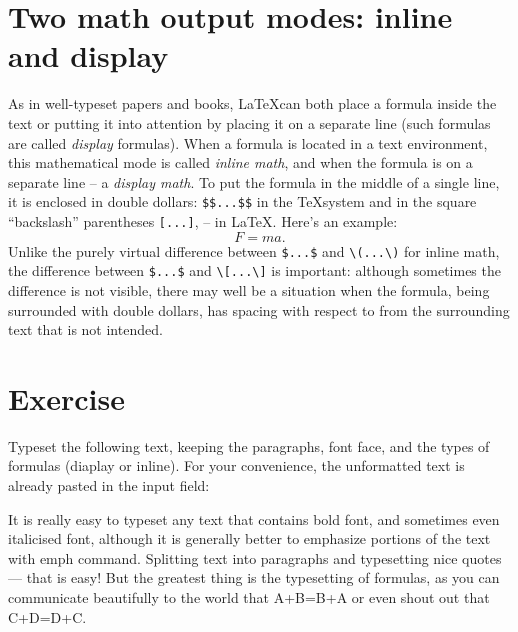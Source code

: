 {\section{Two math output modes: inline and display}
\par As in well-typeset papers and books, \LaTeX can both place a formula inside the text or putting it into attention by placing it on a separate line (such formulas are called \emph{display} formulas). When a formula is located in a text environment, this mathematical mode is called \emph{inline math}, and when the formula is on a separate line -- a \emph{display math}. To put the formula in the middle of a single line, it is enclosed in double dollars: \verb"$$...$$" in the \TeX system and in the square ``backslash'' parentheses \verb"[...]", -- in \LaTeX. Here’s an example: \[F=ma.\]
Unlike the purely virtual difference between \verb"$...$" and \verb"\(...\)" for inline math, the difference between \verb"$...$" and \verb"\[...\]" is important: although sometimes the difference is not visible, there may well be a situation when the formula, being surrounded with double dollars, has spacing with respect to from the surrounding text that is not intended.

\section{Exercise}
\begin{staticpart}
Typeset the following text, keeping the paragraphs, font face, and the types of formulas (diaplay or inline). For your convenience, the unformatted text is already pasted in the input field:
\end{staticpart}
It is really easy to typeset any text that contains bold font, and sometimes even italicised font, although it is generally better to emphasize portions of the text with emph command. Splitting text into paragraphs and typesetting nice quotes --- that is easy! But the greatest thing is the typesetting of formulas, as you can communicate beautifully to the world that A+B=B+A or even shout out that C+D=D+C.


}
